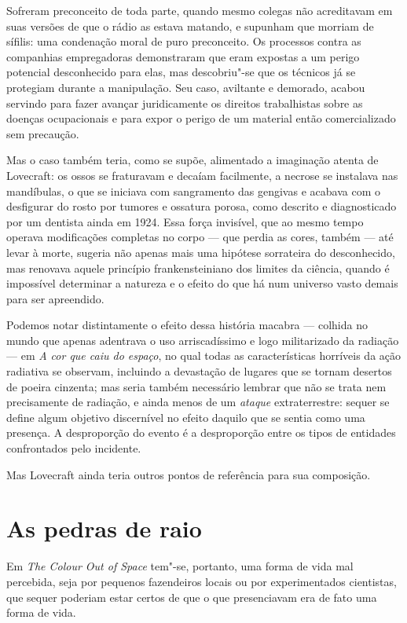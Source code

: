 Sofreram preconceito de toda parte, quando mesmo colegas não acreditavam
em suas versões de que o rádio as estava matando, e supunham que morriam
de sífilis: uma condenação moral de puro preconceito. Os processos
contra as companhias empregadoras demonstraram que eram expostas a um
perigo potencial desconhecido para elas, mas descobriu"-se que os
técnicos já se protegiam durante a manipulação. Seu caso, aviltante e
demorado, acabou servindo para fazer avançar juridicamente os direitos
trabalhistas sobre as doenças ocupacionais e para expor o perigo de um
material então comercializado sem precaução.

Mas o caso também teria, como se supõe, alimentado a imaginação atenta
de Lovecraft: os ossos se fraturavam e decaíam facilmente, a necrose se
instalava nas mandíbulas, o que se iniciava com sangramento das gengivas
e acabava com o desfigurar do rosto por tumores e ossatura porosa, como
descrito e diagnosticado por um dentista ainda em 1924. Essa força
invisível, que ao mesmo tempo operava modificações completas no corpo
--- que perdia as cores, também --- até levar à morte, sugeria não
apenas mais uma hipótese sorrateira do desconhecido, mas renovava aquele
princípio frankensteiniano dos limites da ciência, quando é impossível
determinar a natureza e o efeito do que há num universo vasto demais
para ser apreendido.

Podemos notar distintamente o efeito dessa história macabra --- colhida
no mundo que apenas adentrava o uso arriscadíssimo e logo militarizado
da radiação --- em \textit{A cor que caiu do espaço}, no qual todas as
características horríveis da ação radiativa se observam, incluindo a
devastação de lugares que se tornam desertos de poeira cinzenta; mas
seria também necessário lembrar que não se trata nem precisamente de
radiação, e ainda menos de um \textit{ataque} extraterrestre: sequer se
define algum objetivo discernível no efeito daquilo que se sentia como
uma presença. A desproporção do evento é a desproporção entre os tipos
de entidades confrontados pelo incidente.

Mas Lovecraft ainda teria outros pontos de referência para sua
composição.

\section*{As pedras de raio}

Em \textit{The Colour Out of Space} tem"-se, portanto, uma forma de vida mal
percebida, seja por pequenos fazendeiros locais ou por experimentados
cientistas, que sequer poderiam estar certos de que o que presenciavam
era de fato uma forma de vida.

